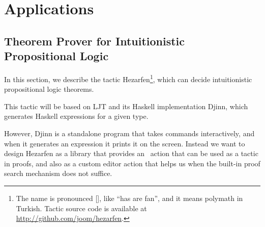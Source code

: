 \chapter{Applications} \label{chap:applications}

\section{Theorem Prover for Intuitionistic Propositional Logic}\label{sec:hezarfen}

In this section, we describe the tactic Hezarfen\footnote{ The name is
  pronounced {[]}, like ``has are fan'', and it means
    polymath in Turkish.  Tactic source code is available at
    \url{http://github.com/joom/hezarfen}.}, which can decide intuitionistic
propositional logic theorems.

This tactic will be based on LJT\cite{ljt} and its Haskell
implementation Djinn\cite{djinn}, which generates Haskell expressions
for a given type.

However, Djinn is a standalone program that takes commands
interactively, and when it generates an expression it prints it on the screen.
Instead we want to design Hezarfen as a library that provides an \Elab\ action
that can be used as a tactic in proofs, and also as a custom editor action that
helps us when the built-in proof search mechanism does not suffice.





